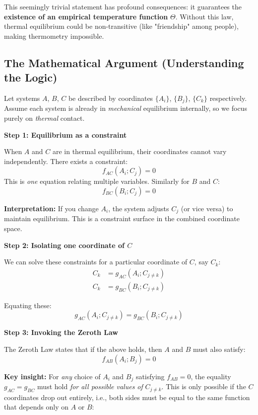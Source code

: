 \documentclass[9pt,twocoloumn]{article}
\begin{document}
This seemingly trivial statement has profound consequences: it guarantees the \textbf{existence of an empirical temperature function} $\Theta$. Without this law, thermal equilibrium could be non-transitive (like "friendship" among people), making thermometry impossible.

\subsection{The Mathematical Argument (Understanding the Logic)}
Let systems $A$, $B$, $C$ be described by coordinates $\{A_i\}$, $\{B_j\}$, $\{C_k\}$ respectively. Assume each system is already in \emph{mechanical} equilibrium internally, so we focus purely on \emph{thermal} contact.

\textbf{Step 1: Equilibrium as a constraint}

When $A$ and $C$ are in thermal equilibrium, their coordinates cannot vary independently. There exists a constraint:
\begin{equation}
f_{AC}(A_i; C_j) = 0
\end{equation}
This is \emph{one} equation relating multiple variables. Similarly for $B$ and $C$:
\begin{equation}
f_{BC}(B_i; C_j) = 0
\end{equation}

\textbf{Interpretation:} If you change $A_i$, the system adjusts $C_j$ (or vice versa) to maintain equilibrium. This is a constraint surface in the combined coordinate space.

\textbf{Step 2: Isolating one coordinate of $C$}

We can solve these constraints for a particular coordinate of $C$, say $C_k$:
\begin{align}
C_k &= g_{AC}(A_i; C_{j \neq k}) \\
C_k &= g_{BC}(B_i; C_{j \neq k})
\end{align}

Equating these:
\begin{equation}
g_{AC}(A_i; C_{j \neq k}) = g_{BC}(B_i; C_{j \neq k})
\end{equation}

\textbf{Step 3: Invoking the Zeroth Law}

The Zeroth Law states that if the above holds, then $A$ and $B$ must also satisfy:
\begin{equation}
f_{AB}(A_i; B_j) = 0
\end{equation}

\textbf{Key insight:} For \emph{any} choice of $A_i$ and $B_j$ satisfying $f_{AB} = 0$, the equality $g_{AC} = g_{BC}$ must hold \emph{for all possible values of} $C_{j \neq k}$. This is only possible if the $C$ coordinates drop out entirely, i.e., both sides must be equal to the same function that depends only on $A$ or $B$:
\end{document}
